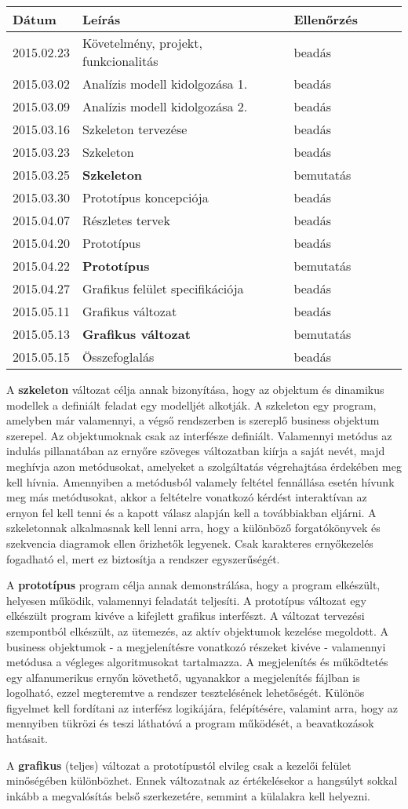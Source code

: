 \begin{longtable}{| l | l | l | l | l | l |}
\hline
\textbf{Dátum}   & \textbf{Leírás} & \textbf{Ellenőrzés} \tabularnewline
\hline
\hline 2015.02.23 & Követelmény, projekt, funkcionalitás & beadás  \tabularnewline
\hline 2015.03.02 & Analízis modell kidolgozása 1. & beadás  \tabularnewline
\hline 2015.03.09 & Analízis modell kidolgozása 2. & beadás  \tabularnewline
\hline 2015.03.16 & Szkeleton tervezése & beadás  \tabularnewline
\hline 2015.03.23 & Szkeleton & beadás  \tabularnewline
\hline 2015.03.25 & \textbf{Szkeleton} & bemutatás  \tabularnewline
\hline 2015.03.30 & Prototípus koncepciója & beadás  \tabularnewline
\hline 2015.04.07 & Részletes tervek & beadás  \tabularnewline
\hline 2015.04.20 & Prototípus & beadás  \tabularnewline
\hline 2015.04.22 & \textbf{Prototípus} & bemutatás  \tabularnewline
\hline 2015.04.27 & Grafikus felület specifikációja & beadás  \tabularnewline
\hline 2015.05.11 & Grafikus változat & beadás  \tabularnewline
\hline 2015.05.13 & \textbf{Grafikus változat} & bemutatás  \tabularnewline
\hline 2015.05.15 & Összefoglalás & beadás  \tabularnewline
\hline
\end{longtable}


A \textbf{szkeleton} változat célja annak bizonyítása, hogy az objektum és dinamikus modellek a definiált feladat egy modelljét alkotják. A szkeleton egy program, amelyben már valamennyi, a végső rendszerben is szereplő business objektum szerepel. Az objektumoknak csak az interfésze definiált. Valamennyi metódus az indulás pillanatában az ernyőre szöveges változatban kiírja a saját nevét, majd meghívja azon metódusokat, amelyeket a szolgáltatás végrehajtása érdekében meg kell hívnia. Amennyiben a metódusból valamely feltétel fennállása esetén hívunk meg más metódusokat, akkor a feltételre vonatkozó kérdést interaktívan az ernyon fel kell tenni és a kapott válasz alapján kell a továbbiakban eljárni. A szkeletonnak alkalmasnak kell lenni arra, hogy a különböző forgatókönyvek és szekvencia diagramok ellen őrizhetők legyenek. Csak karakteres ernyőkezelés fogadható el, mert ez biztosítja a rendszer egyszerűségét. 


A \textbf{prototípus} program célja annak demonstrálása, hogy a program elkészült, helyesen működik, valamennyi feladatát teljesíti. A prototípus változat egy elkészült program kivéve a kifejlett grafikus interfészt. A változat tervezési szempontból elkészült, az ütemezés, az aktív objektumok kezelése megoldott. A business objektumok - a megjelenítésre vonatkozó részeket kivéve - valamennyi metódusa a végleges algoritmusokat tartalmazza. A megjelenítés és működtetés egy alfanumerikus ernyőn követhető, ugyanakkor a megjelenítés fájlban is logolható, ezzel megteremtve a rendszer tesztelésének lehetőségét. Különös figyelmet kell fordítani az interfész logikájára, felépítésére, valamint arra, hogy az mennyiben tükrözi és teszi láthatóvá a program működését, a
beavatkozások hatásait.


A \textbf{grafikus} (teljes) változat a prototípustól elvileg csak a kezelői felület minőségében különbözhet. Ennek
változatnak az értékelésekor a hangsúlyt sokkal inkább a megvalósítás belső szerkezetére, semmint a külalakra kell helyezni.


